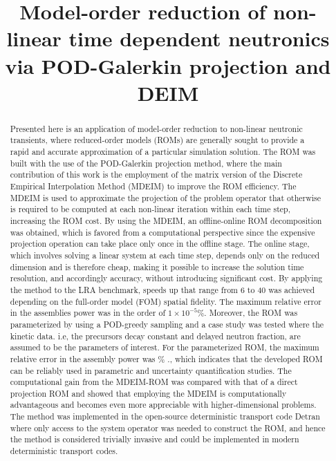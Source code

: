 \documentclass[]{interact}
\theoremstyle{plain}%
\theoremstyle{definition}
\theoremstyle{remark}
\begin{document}

\title{Model-order reduction of non-linear time dependent neutronics via POD-Galerkin projection and DEIM}
\author{
}

\maketitle

\begin{abstract}
Presented here is an application of model-order reduction to non-linear neutronic transients, where reduced-order models (ROMs) are generally sought to provide a rapid and accurate approximation of a particular simulation solution.
The ROM was built with the use of the POD-Galerkin projection method, where the main contribution of this work is the employment of the matrix version of the Discrete Empirical Interpolation Method (MDEIM) to improve the ROM efficiency.
The MDEIM is used to approximate the projection of the problem operator that otherwise is required to be computed at each non-linear iteration within each time step, increasing the ROM cost.
By using the MDEIM, an offline-online ROM decomposition was obtained, which is favored from a computational perspective since the expensive projection operation can take place only once in the offline stage.
The online stage, which involves solving a linear system  at each time step, depends only on the reduced dimension and is therefore cheap, making it possible to increase the solution time resolution, and accordingly accuracy, without introducing significant cost.
By applying the method to the LRA benchmark, speeds up that range from 6 to 40 was achieved depending on the full-order model (FOM) spatial fidelity.
The maximum relative error in the assemblies power was in the order of $1\times10^{-5}$\%.
Moreover, the ROM was parameterized by using a POD-greedy sampling and a case study was tested where the kinetic data. i.e, the precursors decay constant and delayed neutron fraction, are assumed to be the parameters of interest.
For the parameterized ROM, the maximum relative error in the assembly power was  \% ., which indicates that the developed ROM can be reliably used in parametric and uncertainty quantification studies.
The computational gain from the MDEIM-ROM was compared with that of a direct projection ROM and showed that employing the MDEIM is computationally advantageous and becomes even more appreciable with higher-dimensional problems.
The method was implemented in the open-source deterministic transport code Detran where only access to the system operator was needed to construct the ROM, and hence the method is considered trivially invasive and could be implemented in modern deterministic transport codes.


\end{abstract}
\end{document}
